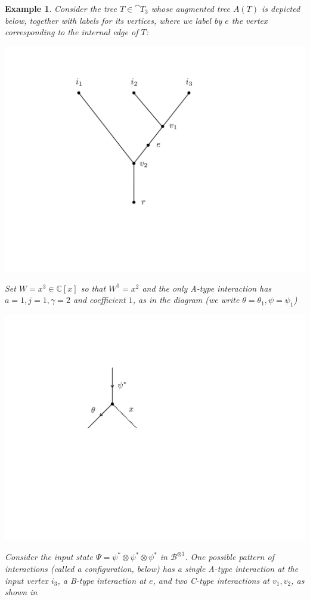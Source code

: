 \documentclass[english,letter paper,12pt,leqno]{article}
\theoremstyle{example}
\newtheorem{example}[theorem]{Example}
\numberwithin{equation}{section}
\begin{document}
\begin{example} Consider the tree $T \in \cat{T}_3$ whose augmented tree $A(T)$ is depicted below, together with labels for its vertices, where we label by $e$ the vertex corresponding to the internal edge of $T$:
\begin{center}
\includegraphics[scale=0.25]{dia7}
\end{center}
Set $W = x^3 \in \mathbb{C}[x]$ so that $W^1 = x^2$ and the only A-type interaction has $a = 1, j = 1, \gamma = 2$ and coefficient $1$, as in the diagram (we write $\theta = \theta_1, \psi = \psi_1$)
\begin{center}
\includegraphics[scale=0.3]{dia5}
\end{center}
Consider the input state $\Psi = \psi^* \otimes \psi^* \otimes \psi^*$ in $\mathscr{B}^{\otimes 3}$. One possible pattern of interactions (called a configuration, below) has a single A-type interaction at the input vertex $i_3$, a B-type interaction at $e$, and two C-type interactions at $v_1,v_2$, as shown in

\end{example}
\end{document}
